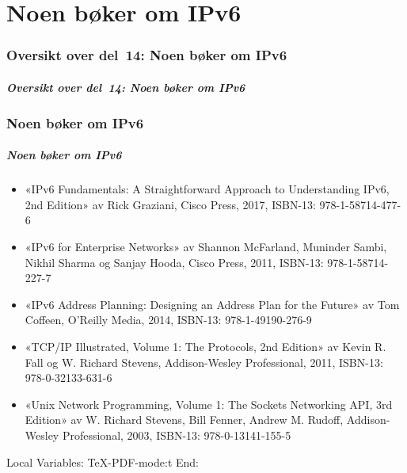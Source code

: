 \part{Noen bøker om IPv6}

\begin{frame}
  \partpage
\end{frame}

\section*{Oversikt over del~14: Noen bøker om IPv6}
\begin{frame}
  \frametitle{Oversikt over del~14: Noen bøker om IPv6}
    \tableofcontents
\end{frame}

\section{Noen bøker om IPv6}
\begin{frame}
  \frametitle{Noen bøker om IPv6}
  \begin{itemize}
  \item «IPv6 Fundamentals: A Straightforward Approach to
    Understanding IPv6, 2nd Edition» av Rick Graziani, Cisco Press,
    2017, ISBN-13: 978-1-58714-477-6
  \item «IPv6 for Enterprise Networks» av Shannon McFarland, Muninder
    Sambi, Nikhil Sharma og Sanjay Hooda, Cisco Press, 2011, ISBN-13:
    978-1-58714-227-7
  \item «IPv6 Address Planning: Designing an Address Plan for the
    Future» av Tom Coffeen, O'Reilly Media, 2014, ISBN-13:
    978-1-49190-276-9
  \item «TCP/IP Illustrated, Volume 1: The Protocols, 2nd Edition» av
    Kevin R. Fall og W. Richard Stevens, Addison-Wesley Professional,
    2011, ISBN-13: 978-0-32133-631-6
  \item «Unix Network Programming, Volume 1: The Sockets Networking
    API, 3rd Edition» av W. Richard Stevens, Bill Fenner, Andrew
    M. Rudoff, Addison-Wesley Professional, 2003, ISBN-13: 978-0-13141-155-5
  \end{itemize}
\end{frame}



Local Variables:
TeX-PDF-mode:t
End:
